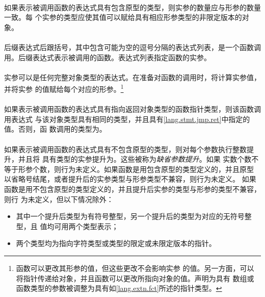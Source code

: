 {\paragraph{}
如果表示被调用函数的表达式具有包含原型的类型，则实参的数量应与形参的数量一致。每
个实参的类型应使其值可以赋给具有相应形参类型的非限定版本的对象。

\semantic
\paragraph{}
后缀表达式后跟括号\tm{()}，其中包含可能为空的逗号分隔的表达式列表，是一个函数调
用。后缀表达式表示被调用的函数。表达式列表指定函数的实参。

\paragraph{}
实参可以是任何完整对象类型的表达式。在准备对函数的调用时，将计算实参值，并将实参
的值赋给每个对应的形参。\footnote{函数可以更改其形参的值，但这些更改不会影响实参
的值。另一方面，可以将指针传递给对象，并且函数可以更改所指向对象的值。声明为具有
数组或函数类型的参数被调整为具有如\ref{lang.extn.fct}所述的指针类型。}

\paragraph{}
如果表示被调用函数的表达式具有指向返回对象类型的函数指针类型，则该函数调用表达式
与该对象类型具有相同的类型，并且具有\ref{lang.stmt.jmp.ret}中指定的值。否则，函
数调用的类型为。

\paragraph{}
如果表示被调用函数的表达式具有不包含原型的类型，则对每个参数执行整数提升，并且将
具有类型的实参提升为。这些被称为\textit{缺省参数提升}。如果
实数个数不等于形参个数，则行为未定义。如果函数是用包含原型的类型定义的，并且原型
以省略号\tm{(, \ldots)}结尾，或者提升后的实参类型与形参类型不兼容，则行为未定义。
如果函数是用不包含原型的类型定义的，并且提升后实参的类型与形参的类型不兼容，则行
为未定义，但以下情况除外：
\begin{itemize}
  \item{其中一个提升后类型为有符号整型，另一个提升后的类型为对应的无符号整型，且
    值均可用两个类型表示；}
  \item{两个类型均为指向字符类型或类型的限定或未限定版本的指针。}
\end{itemize}

}
